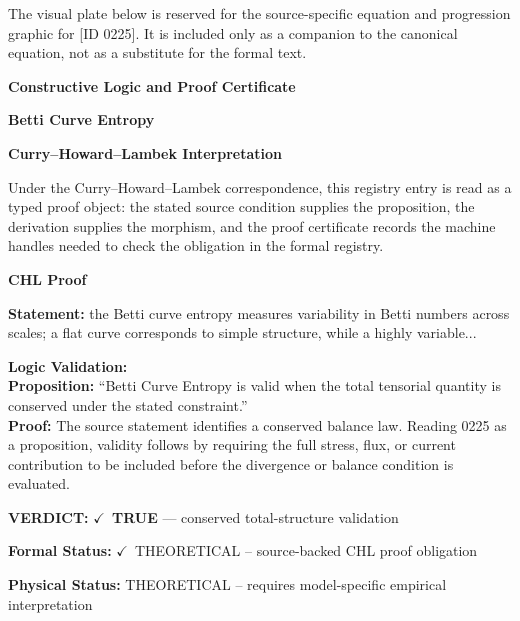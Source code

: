 \begingroup\footnotesize\sloppy
The visual plate below is reserved for the source-specific equation and progression graphic for [ID 0225]. It is included only as a companion to the canonical equation, not as a substitute for the formal text.
\par\endgroup
\ifTZPDarkEdition
{}
\fi

\clearpage
\begingroup\tzpsupportsetup
\noindent\textbf{\fontsize{10.8pt}{12.8pt}\selectfont [ID 0225] Constructive Logic and Proof Certificate}\par
\noindent\textbf{\fontsize{10pt}{12pt}\selectfont Betti Curve Entropy}\par
\vspace{0.45em}
\begingroup
\footnotesize
\setlength{\parskip}{0.22em}
\setlength{\parindent}{0pt}
\noindent\textbf{Curry--Howard--Lambek Interpretation}\par
Under the Curry--Howard--Lambek correspondence, this registry entry is read as a typed proof
object: the stated source condition supplies the proposition, the derivation supplies the
morphism, and the proof certificate records the machine handles needed to check the obligation
in the formal registry.

\vspace{0.45em}
\noindent\textbf{CHL Proof}\par
\textbf{Statement:} the Betti curve entropy measures variability in Betti numbers across scales; a flat
curve corresponds to simple structure, while a highly variable...

\textbf{Logic Validation:}\\
\textbf{Proposition:} ``Betti Curve Entropy is valid when the total tensorial quantity is conserved under the
stated constraint.''\\
\textbf{Proof:} The source statement identifies a conserved balance law. Reading 0225 as a proposition,
validity follows by requiring the full stress, flux, or current contribution to be
included before the divergence or balance condition is evaluated.

\textbf{VERDICT:} \ensuremath{\checkmark}\ \textbf{TRUE} --- conserved total-structure validation

\textbf{Formal Status:} \ensuremath{\checkmark}\ THEORETICAL -- source-backed CHL proof obligation

\textbf{Physical Status:} THEORETICAL -- requires model-specific empirical interpretation
\par\vspace{0.45em}
\par
\ifTZPDarkEdition
{}
\fi
\endgroup
\endgroup
